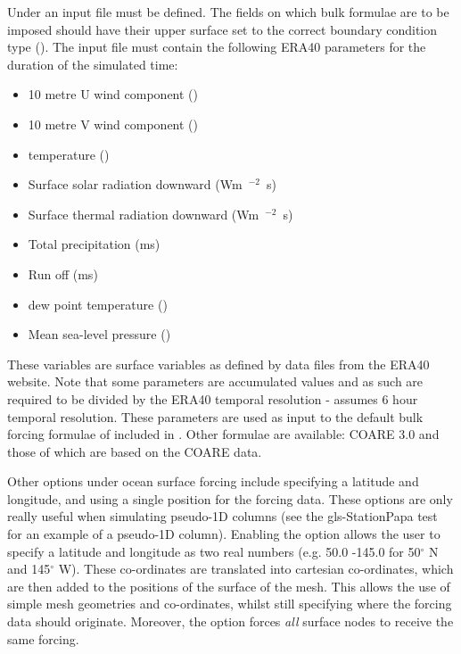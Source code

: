 Under  an input file must be defined. The fields on 
which bulk formulae are to be imposed should have their upper surface set to the correct
boundary condition type ().
The input file must contain the following ERA40 parameters for the
duration of the simulated time:
\begin{itemize}
 \item 10 metre U wind component (\ms)
 \item 10 metre V wind component (\ms)
 \item \m[2] temperature (\K)
 \item Surface solar radiation downward (\unit{Wm\ensuremath{^{-2}}s})
 \item Surface thermal radiation downward (\unit{Wm\ensuremath{^{-2}}s})
 \item Total precipitation (\unit{ms})
 \item Run off (\unit{ms})
 \item \m[2] dew point temperature (\K)
 \item Mean sea-level pressure (\Pa)
\end{itemize}

These variables are surface variables as defined by data files from the ERA40 website. Note that some parameters are accumulated values
and as such are required to be divided by the ERA40 temporal resolution - \fluidity { } assumes 6 hour temporal resolution. 
These parameters are used as input to the default bulk forcing formulae of \citet{large2004} included in \fluidity. Other
formulae are available: COARE 3.0 \citep{fairall2003} and those of \citet{kara2005} which are based on the COARE data.

Other options under ocean surface forcing include specifying a latitude and longitude, and using a single position for the
forcing data. These options are only really useful when simulating pseudo-1D columns (see the gls-StationPapa test for an example
of a pseudo-1D column). Enabling the  option allows the user to specify a latitude and longitude as
two real numbers (e.g. 50.0 -145.0 for 50$^\circ$ N and 145$^\circ$ W). These co-ordinates are translated into cartesian
co-ordinates, which are then added to the positions of the surface of the mesh. This allows the use of simple mesh geometries
and co-ordinates, whilst still specifying where the forcing data should originate. Moreover, the 
option forces \emph{all} surface nodes to receive the same forcing.

